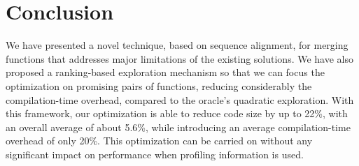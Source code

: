
\section{Conclusion}

We have presented a novel technique, based on sequence alignment, for merging
functions that addresses major limitations of the existing solutions.
We have also proposed a ranking-based exploration mechanism so that we can focus
the optimization on promising pairs of functions, reducing considerably the
compilation-time overhead, compared to the oracle's quadratic exploration.
With this framework, our
optimization is able to reduce code size by up to 22\%, with an overall average
of about 5.6\%, while introducing an average compilation-time overhead of only 20\%.
This optimization can be carried on without any significant impact on
performance when profiling information is used.

